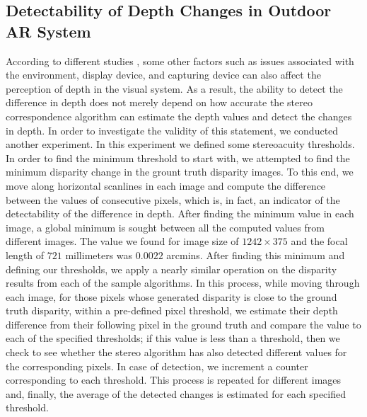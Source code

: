 \subsection{Detectability of Depth Changes in Outdoor AR System}
According to different studies \cite{dras96, kru10,azuma01}, some other factors such as issues associated with the environment, display device, and capturing device
can also affect the perception of depth in the visual system. As a result, the ability to detect the difference in depth 
does not merely depend on how accurate the stereo correspondence algorithm can estimate the depth values and detect the changes in depth.
In order to investigate the validity of this statement, we conducted another experiment. In this experiment we defined some stereoacuity thresholds. 
In order to find the minimum threshold to start with, we attempted to find the 
minimum disparity change in the grount truth disparity images. To this end, we move along horizontal scanlines in each image and 
compute the difference between the values of consecutive pixels, which is, in fact, an indicator of the detectability of the difference in depth. 
After finding the minimum value in each image, a global minimum is sought between all the computed values from different images.
The value we found for image size of $1242\times375$ and the focal length of $721$ millimeters was $0.0022$ arcmins.
After finding this minimum and defining our thresholds, we apply a nearly similar operation on the disparity results from each of the sample algorithms.
In this process, while moving through each image, for those pixels whose generated disparity is close to the ground truth disparity, within a pre-defined pixel threshold, 
we estimate their depth difference from their following pixel
in the ground truth and compare the value to each of the specified thresholds; if this value is less than a threshold, then we check to see whether
the stereo algorithm has also detected different values for the corresponding pixels. 
In case of detection, we increment a counter corresponding to each threshold.
This process is repeated for different images and, finally, the average of the detected changes is estimated for each specified threshold.

